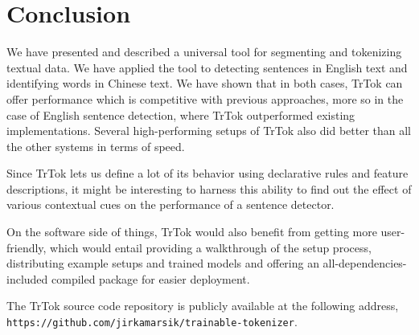\section{Conclusion}
\label{sec:outro}

We have presented and described a universal tool for segmenting and
tokenizing textual data. We have applied the tool to detecting
sentences in English text and identifying words in Chinese text. We
have shown that in both cases, TrTok can offer performance which is
competitive with previous approaches, more so in the case of English
sentence detection, where TrTok outperformed existing implementations.
Several high-performing setups of TrTok also did better than all the
other systems in terms of speed.

Since TrTok lets us define a lot of its behavior using declarative
rules and feature descriptions, it might be interesting to harness
this ability to find out the effect of various contextual cues on the
performance of a sentence detector.

On the software side of things, TrTok would also benefit from getting
more user-friendly, which would entail providing a walkthrough of the
setup process, distributing example setups and trained models and
offering an all-dependencies-included compiled package for easier
deployment.

The TrTok source code repository is publicly available at the
following address, \\
\texttt{https://github.com/jirkamarsik/trainable-tokenizer}.
